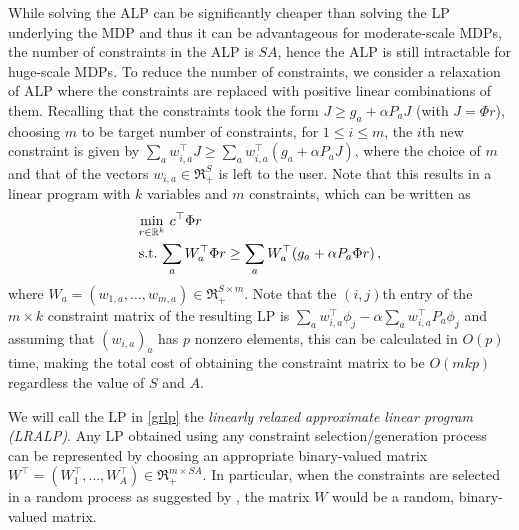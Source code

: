 \documentclass[12pt,draftcls,onecolumn]{IEEEtran}
\begin{document}
While solving the ALP can be significantly cheaper than solving the LP underlying the MDP
and thus it can be advantageous for moderate-scale MDPs,
 the number of constraints in the ALP is $SA$,
hence the ALP is still intractable for huge-scale MDPs.
To reduce the number of constraints, we consider a relaxation of ALP
where the constraints are replaced with positive linear
combinations of them.
Recalling that the constraints took the form $J \ge g_a + \alpha P_a J$ (with $J = \Phi r$),
choosing $m$ to be target number of constraints, for $1\le i \le m$, the $i$th new constraint is given by
$\sum_a w_{i,a}^\top J \ge \sum_a w_{i,a}^\top(g_a + \alpha P_a J)$,
where the choice of $m$ and that of the vectors $w_{i,a}\in \Re_+^S$ is left to the user.
Note that this results in a linear program with $k$ variables and $m$ constraints, which can be written as
\begin{align}\label{grlp}
\begin{split}
&\underset{r\in \Re^k}{\min}\, \, c^\top \Phi r\\
&\text{s.t.}\mb  \,\sum_a W_a^\top \Phi r\geq \sum_a W_a^\top (g_a + \alpha P_a \Phi r)\,,
\end{split}
\end{align}
where $W_a = (w_{1,a},\dots,w_{m,a}) \in \Re_+^{S \times m}$.
Note that the $(i,j)$th entry of the $m\times k$ constraint matrix of the resulting LP is
$\sum_a  w_{i,a}^\top  \phi_j - \alpha \sum_a w_{i,a}^\top P_a \phi_j$ and assuming that $(w_{i,a})_{a}$ has $p$ nonzero
elements, this can be calculated in $O( p )$ time, making the total cost of obtaining the constraint matrix to be $O(mkp)$ regardless the value of $S$ and $A$. 

We will call the LP in \eqref{grlp} the \emph{linearly relaxed approximate linear program (LRALP)}.
Any LP obtained using
any constraint selection/generation process can be represented by choosing an appropriate binary-valued matrix
$W^\top = (W_1^\top,\dots,W_A^\top)\in \Re_+^{m\times SA}$. In particular, when the constraints are selected
in a random process as suggested by \citet{CS}, the matrix $W$ would be a random, binary-valued matrix.
\end{document}
